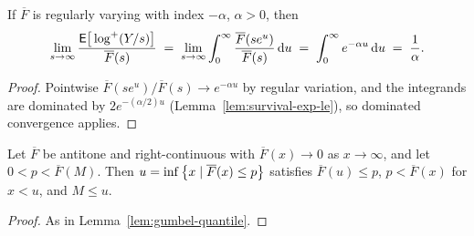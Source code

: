 \begin{lemma}
  \label{lem:tail-integral-log-excess}
  \leanok
  If $\overline{F}$ is regularly varying with index $-\alpha$, $\alpha > 0$, then
  \begin{align*}
    \lim_{s \to \infty} \frac{\mathsf{E} \big[ \log^+(Y/s) \big]}{\overline{F}(s)} \; = \;
    \lim_{s \to \infty} \int_0^\infty \frac{\overline{F}(s e^u)}{\overline{F}(s)} \, \mathrm{d} u
    \; = \; \int_0^\infty e^{-\alpha u} \, \mathrm{d} u \; = \; \frac{1}{\alpha} .
  \end{align*}
\end{lemma}
\begin{proof}
  \leanok
  Pointwise $\overline{F}(s e^u)/\overline{F}(s) \to e^{-\alpha u}$ by regular variation, and the
  integrands are dominated by $2 e^{-(\alpha/2) u}$ (Lemma~\ref{lem:survival-exp-le}), so dominated
  convergence applies.
\end{proof}

\begin{lemma}
  \label{lem:hill-threshold}
  \leanok
  Let $\overline{F}$ be antitone and right-continuous with $\overline{F}(x) \to 0$ as
  $x \to \infty$, and let $0 < p < \overline{F}(M)$. Then $u = \inf \left\{  x \; | \; \overline{F}(x) \le p  \right\}$
  satisfies $\overline{F}(u) \le p$, $p < \overline{F}(x)$ for $x < u$, and $M \le u$.
\end{lemma}
\begin{proof}
  \leanok
  As in Lemma~\ref{lem:gumbel-quantile}.
\end{proof}

